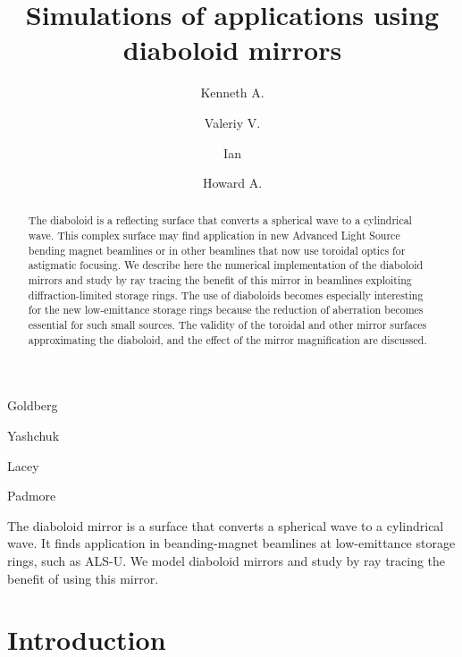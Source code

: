 \documentclass[preprint]{iucr}       %
\newcommand{\inred}[1]{{\color{red}#1}}
\begin{document}




\title{Simulations of applications using diaboloid mirrors}

\author[a]{Kenneth A.}{Goldberg}
\author[a]{Valeriy V.}{Yashchuk}
\author[a]{Ian}{Lacey}
\author[a]{Howard A.}{Padmore}




\begin{synopsis}
The diaboloid mirror is a surface that converts a spherical wave to a cylindrical wave. It finds application in beanding-magnet beamlines at low-emittance storage rings, such as ALS-U. We model diaboloid mirrors and study by ray tracing the benefit of using this mirror.
\end{synopsis}

\begin{abstract}
The diaboloid is a reflecting surface that converts a spherical wave to a cylindrical wave. This complex surface may find application in new Advanced Light Source bending magnet beamlines or in other beamlines that now use toroidal optics for astigmatic focusing. We describe here the numerical implementation of the diaboloid mirrors and study by ray tracing the benefit of this mirror in beamlines exploiting diffraction-limited storage rings.
\inred{The use of diaboloids becomes especially interesting for the new low-emittance storage rings because the reduction of aberration becomes essential for such small sources. The validity of the toroidal and other mirror surfaces approximating the diaboloid, and the effect of the mirror magnification are discussed.}
\end{abstract}

\section{Introduction}
\end{document}
